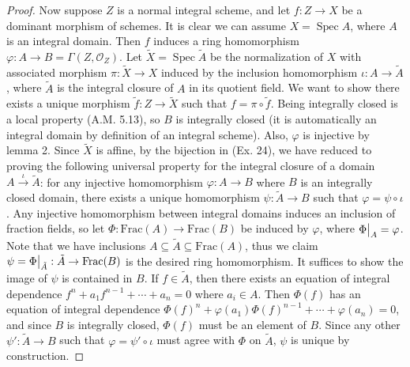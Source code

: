 \documentclass{article}
\newcommand{\OO}{\mathscr{O}}
\DeclareMathOperator{\spec}{Spec}
\newcommand\restr[2]{{%
  \left.\kern-\nulldelimiterspace %
  #1 %
  \vphantom{\big|} %
  \right|_{#2} %
}}
\begin{document}
\begin{enumerate} [label=\textbf{\arabic*.}, leftmargin=0em]
\begin{proof}
    Now suppose $Z$ is a normal integral scheme, and let $f : Z \to X$ be a dominant morphism of schemes. It is clear we can assume $X = \spec{A}$, where $A$ is an integral domain. Then $f$ induces a ring homomorphism $\varphi : A \to B = \Gamma(Z, \OO_Z)$. Let $\tilde{X} = \spec{\tilde{A}}$ be the normalization of $X$ with associated morphism $\pi : \tilde{X} \to X$ induced by the inclusion homomorphism $\iota : A \to \tilde{A}$, where $\tilde{A}$ is the integral closure of $A$ in its quotient field. We want to show there exists a unique morphism $\tilde{f} : Z \to \tilde{X}$ such that $f = \pi \circ \tilde{f}$. Being integrally closed is a local property (A.M. 5.13), so $B$ is integrally closed (it is automatically an integral domain by definition of an integral scheme). Also, $\varphi$ is injective by lemma 2. Since $\tilde{X}$ is affine, by the bijection in (Ex. 24), we have reduced to proving the following universal property for the integral closure of a domain $A \xrightarrow{\iota} \tilde{A}$: for any injective homomorphism $\varphi : A \to B$ where $B$ is an integrally closed domain, there exists a unique homomorphism $\psi : \tilde{A} \to B$ such that $\varphi = \psi \circ \iota$. Any injective homomorphism between integral domains induces an inclusion of fraction fields, so let $\Phi : \text{Frac}(A) \to \text{Frac}(B)$ be induced by $\varphi$, where $\restr{\Phi}{A} = \varphi$. Note that we have inclusions $A \subseteq \tilde{A} \subseteq \text{Frac}(A)$, thus we claim $\psi = \restr{\Phi}{\tilde{A}} : \tilde{A} \to \text{Frac}(B)$ is the desired ring homomorphism. It suffices to show the image of $\psi$ is contained in $B$. If $f \in \tilde{A}$, then there exists an equation of integral dependence $f^n + a_1 f^{n - 1} + \cdots + a_n = 0$ where $a_i \in A$. Then $\Phi(f)$ has an equation of integral dependence $\Phi(f)^n + \varphi(a_1) \Phi(f)^{n - 1} + \cdots + \varphi(a_n) = 0$, and since $B$ is integrally closed, $\Phi(f)$ must be an element of $B$. Since any other $\psi' : \tilde{A} \to B$ such that $\varphi = \psi' \circ \iota$ must agree with $\Phi$ on $\tilde{A}$, $\psi$ is unique by construction.
\end{proof}


\end{enumerate}
\end{document}
